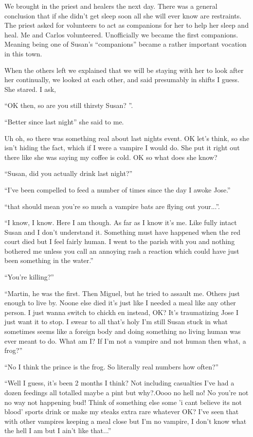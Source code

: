 We brought in the priest and healers the next day. There was a general conclusion that if she didn't get sleep soon all she will ever know are restraints. The priest asked for volunteers to act as companions for her to help her sleep and heal. Me and Carlos volunteered. Unofficially we became the first companions. Meaning being one of Susan's ``companions'' became a rather important vocation in this town.

When the others left we explained that we will be staying with her to look after her continually, we looked at each other, and said presumably in shifts I guess. She stared. I ask, 

``OK then, so are you still thirsty Susan? ''.  

``Better since last night'' she said to me. 

Uh oh, so there was something real about last nights event. OK let's think, so she isn't hiding the fact, which if I were a vampire I would do. She put it right out there like she was saying my coffee is cold. OK so what does she know? 

``Susan, did you actually drink last night?'' 

``I've been compelled to feed a number of times since the day I awoke Jose.'' 

``that should mean you're so much a vampire bats are flying out your...''. 

``I know, I know. Here I am though. As far as I know it's me. Like fully intact Susan and I don't understand it. Something must have happened when the red court died but I feel fairly human. I went to the parish with you and nothing bothered me unless you call an annoying rash a reaction which could have just been something in the water.''

``You're killing?''

``Martin, he was the first. Then Miguel, but he tried to assault me. Others just enough to live by. Noone else died it's just like I needed a meal like any other person. I just wanna switch to chickh
en instead, OK? It's traumatizing Jose I just want it to stop. I swear to all that's holy I'm still Susan stuck in what sometimes seems like a foreign body and doing something no living human was ever meant to do. What am I? If I'm not a vampire and not human then what, a frog?''

``No I think the prince is the frog. So literally real numbers how often?''

``Well I guess, it's been 2 months I think? Not including casualties I've had a dozen feedings all totalled maybe a pint but why?.Oooo no hell no! No you're not no way not happening bud! Think of something else some 'i cant believe its not blood' sports drink or make my steaks extra rare whatever OK? I've seen that with other vampires keeping a meal close but I'm no vampire, I don't know what the hell I am but I ain't like that...''

